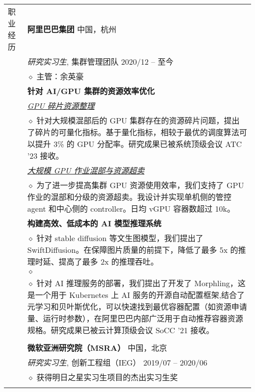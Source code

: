 \documentclass[letterpaper, 10pt]{article}
\begin{document}
\begin{longtable}{p{1.3in}p{5.0in}}
{职业经历}
& {\textbf{阿里巴巴集团}} \hfill 中国，杭州 \\
& \textit{研究实习生}, 集群管理团队 \hfill 2020/12 -- 至今 \\
& $\diamond$ 主管：余英豪 \\
& \textbf{针对 AI/GPU 集群的资源效率优化} \\
& \textit{\underline{GPU 碎片资源整理}} \\
& $\diamond$ 针对大规模混部后的 GPU 集群存在的资源碎片问题，提出了碎片的可量化指标。基于量化指标，相较于最优的调度算法可以提升 3\% 的 GPU 分配率。研究成果已被系统顶级会议 ATC '23 接收。 \\
& \textit{\underline{大规模 GPU 作业混部与资源超卖}} \\
& $\diamond$ 为了进一步提高集群 GPU 资源使用效率，我们支持了 GPU 作业的混部和分级的资源超卖。我设计并实现单机侧的管控 agent 和中心侧的 controller。日均 vGPU 容器数超过 10k。 \\
& \textbf{构建高效、低成本的 AI 模型推理系统} \\
& $\diamond$ 针对 stable diffusion 等文生图模型，我们提出了 SwiftDiffusion。在保障图片质量的前提下，降低了最多 5x 的推理时延、提高了最多 2x 的推理吞吐。 \\
& $\diamond$  \\
& $\diamond$ 针对 AI 推理服务的部署，我们提出了开发了 Morphling，这是一个用于 Kubernetes 上 AI 服务的开源自动配置框架,结合了元学习和贝叶斯优化，可以快速找到最优容器配置（如资源申请量、运行时参数），在阿里巴巴内部广泛用于自动推荐容器资源规格。研究成果已被云计算顶级会议 SoCC '21 接收。 \\
& \\

& {\textbf{微软亚洲研究院（MSRA）}} \hfill 中国，北京 \\
& \textit{研究实习生}, 创新工程组（IEG） \hfill 2019/07 -- 2020/06 \\
& $\diamond$ 获得明日之星实习生项目的杰出实习生奖 \\
& \\


\end{longtable}
\end{document}
